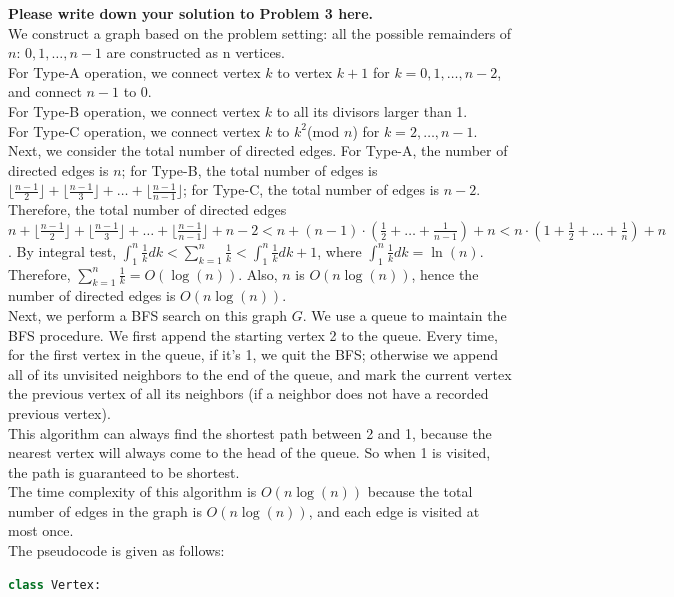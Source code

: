 \documentclass[11pt,twoside]{article}
\newenvironment{solution}{{\par\noindent\it Solution.}}{}
\begin{document}
\begin{solution}
\textbf{Please write down your solution to Problem 3 here.}
\vspace{10pt}\\
We construct a graph based on the problem setting: all the possible remainders of $n$: $0,1,\dots,n-1$ are constructed as n vertices.
\vspace{10pt}\\
For Type-A operation, we connect vertex $k$ to vertex $k+1$ for $k=0,1,\dots,n-2$, and connect $n-1$ to 0.
\vspace{10pt}\\
For Type-B operation, we connect vertex $k$ to all its divisors larger than 1.
\vspace{10pt}\\
For Type-C operation, we connect vertex $k$ to $k^2$(mod $n$) for $k=2,\dots,n-1$.
\vspace{10pt}\\
Next, we consider the total number of directed edges. For Type-A, the number of directed edges is $n$;
for Type-B, the total number of edges is $\lfloor\frac{n-1}{2}\rfloor+\lfloor\frac{n-1}{3}\rfloor+\dots+\lfloor\frac{n-1}{n-1}\rfloor$;
for Type-C, the total number of edges is $n-2$. 
\vspace{10pt}\\
Therefore, the total number of directed edges $n+\lfloor\frac{n-1}{2}\rfloor+\lfloor\frac{n-1}{3}\rfloor+\dots+\lfloor\frac{n-1}{n-1}\rfloor+n-2
<n+(n-1)\cdot(\frac{1}{2}+\dots+\frac{1}{n-1})+n<n\cdot(1+\frac{1}{2}+\dots+\frac{1}{n})+n$.
By integral test, $\int_{1}^{n}\frac{1}{k}dk<\sum_{k=1}^{n}\frac{1}{k}<\int_{1}^{n}\frac{1}{k}dk+1$, where $\int_{1}^{n}\frac{1}{k}dk=\ln(n)$.
Therefore, $\sum_{k=1}^{n}\frac{1}{k}=O(\log(n))$. Also, $n$ is $O(n\log(n))$, hence the number of directed edges is $O(n\log(n))$.
\vspace{10pt}\\
Next, we perform a BFS search on this graph $G$. We use a queue to maintain the BFS procedure. 
We first append the starting vertex 2 to the queue. 
Every time, for the first vertex in the queue, if it's 1, we quit the BFS; otherwise we append all of its unvisited neighbors to the end of the queue,
and mark the current vertex the previous vertex of all its neighbors (if a neighbor does not have a recorded previous vertex).
\vspace{10pt}\\
This algorithm can always find the shortest path between 2 and 1, because the nearest vertex will always come to the head of the queue.
So when 1 is visited, the path is guaranteed to be shortest. 
\vspace{10pt}\\
The time complexity of this algorithm is $O(n\log(n))$ because the total number of edges in the graph is $O(n\log(n))$,
and each edge is visited at most once.
\vspace{10pt}\\
The pseudocode is given as follows:
\begin{lstlisting}[language=Python]
class Vertex:


\end{lstlisting}
\end{solution}
\end{document}
